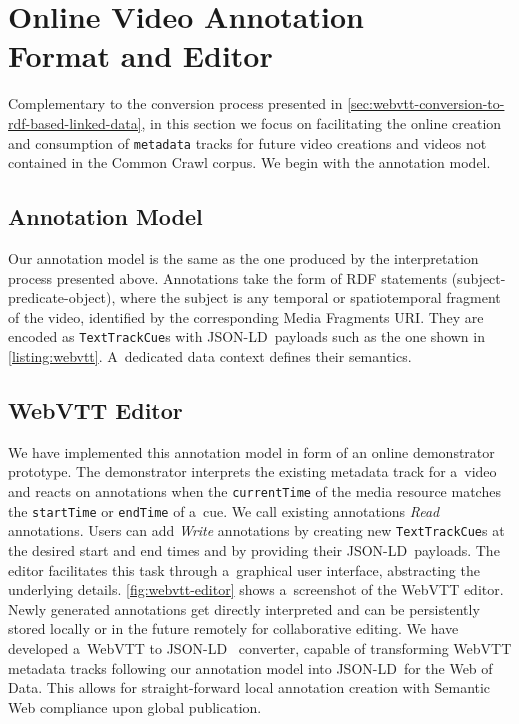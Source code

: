 \documentclass{sig-alternate-ceur}
\def\JSONLD{\mbox{JSON-LD}}
\begin{document}
\section{Online Video Annotation\\ Format and Editor}
\label{sec:online-video-annotation-format-and-editor}

Complementary to the conversion process presented
in \autoref{sec:webvtt-conversion-to-rdf-based-linked-data},
in this section we focus on facilitating the online creation and consumption
of \texttt{metadata} tracks for future video creations
and videos not contained in the Common Crawl corpus.
We begin with the annotation model.

\subsection{Annotation Model}

Our annotation model is the same as the one produced
by the interpretation process presented above.
Annotations take the form of RDF statements (subject-predicate-object),
where the subject is any temporal or spatiotemporal fragment of the video,
identified by the corresponding Media Fragments URI. 
They are encoded as \texttt{TextTrackCue}s
with \JSONLD\ payloads such as the one shown in \autoref{listing:webvtt}.
A~dedicated data context defines their semantics.

\subsection{WebVTT Editor}

We have implemented this annotation model
in form of an online demonstrator prototype.
The demonstrator interprets the existing metadata track for a~video
and reacts on annotations when the \texttt{currentTime}
of the media resource matches the
\texttt{startTime} or \texttt{endTime} of a~cue.
We call existing annotations \emph{Read} annotations.
Users can add \emph{Write} annotations
by creating new \texttt{TextTrackCue}s
at the desired start and end times
and by providing their \JSONLD~payloads.
The editor facilitates this task through a~graphical user interface, abstracting the underlying details.
\autoref{fig:webvtt-editor} shows a~screenshot of the WebVTT editor.
Newly generated annotations get directly interpreted
and can be persistently stored locally
or in the future remotely for collaborative editing.
We have developed a~WebVTT to \JSONLD~%
converter, capable of transforming WebVTT metadata tracks
following our annotation model
into \JSONLD~for the Web of Data.
This allows for straight-forward local annotation creation
with Semantic Web compliance upon global publication.
\end{document}

